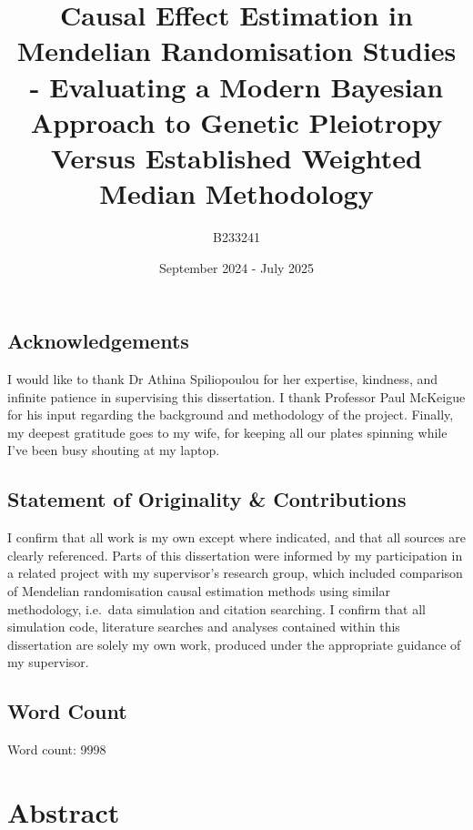 \documentclass[
]{article}
\title{Causal Effect Estimation in Mendelian Randomisation Studies - Evaluating a Modern Bayesian Approach to Genetic Pleiotropy Versus Established Weighted Median Methodology}
\author{B233241}
\date{September 2024 - July 2025}
\begin{document}
\maketitle

{
\hypersetup{linkcolor=}
\setcounter{tocdepth}{2}
\tableofcontents
}
\newpage

\subsection*{Acknowledgements}\label{acknowledgements}

I would like to thank Dr Athina Spiliopoulou for her expertise, kindness, and infinite patience in supervising this dissertation. I thank Professor Paul McKeigue for his input regarding the background and methodology of the project. Finally, my deepest gratitude goes to my wife, for keeping all our plates spinning while I've been busy shouting at my laptop.

\subsection*{Statement of Originality \& Contributions}\label{statement-of-originality-contributions}

I confirm that all work is my own except where indicated, and that all sources are clearly referenced. Parts of this dissertation were informed by my participation in a related project with my supervisor's research group, which included comparison of Mendelian randomisation causal estimation methods using similar methodology, i.e.~data simulation and citation searching. I confirm that all simulation code, literature searches and analyses contained within this dissertation are solely my own work, produced under the appropriate guidance of my supervisor.

\subsection*{Word Count}\label{word-count}

Word count:
9998

\newpage

\section{Abstract}\label{abstract}
\end{document}
